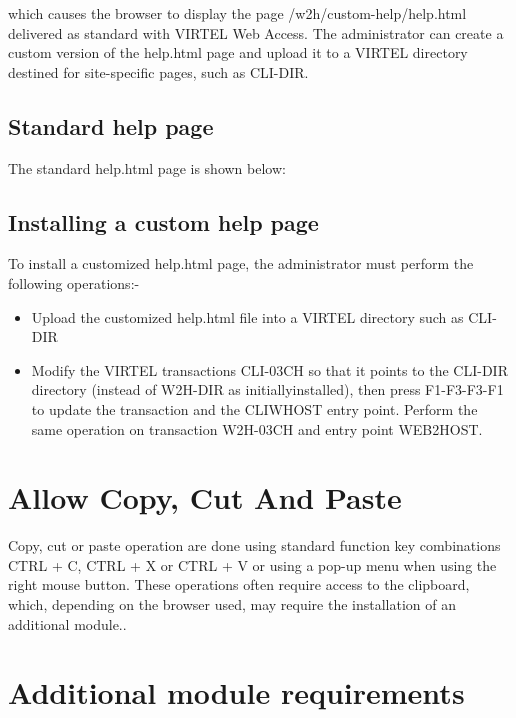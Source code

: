 \documentclass[letterpaper,10pt,english]{sphinxmanual}
\begin{document}

which causes the browser to display the page /w2h/custom-help/help.html delivered as standard with VIRTEL Web Access.
The administrator can create a custom version of the help.html page and upload it to a VIRTEL directory destined for
site-specific pages, such as CLI-DIR.


\subsection{Standard help page}
\label{\detokenize{User_Guide:standard-help-page}}
The standard help.html page is shown below:



\subsection{Installing a custom help page}
\label{\detokenize{User_Guide:installing-a-custom-help-page}}
To install a customized help.html page, the administrator must perform the following operations:-
\begin{itemize}
\item {} 
Upload the customized help.html file into a VIRTEL directory such as CLI-DIR

\item {} 
Modify the VIRTEL transactions CLI-03CH so that it points to the CLI-DIR directory (instead of W2H-DIR as initiallyinstalled), then press F1-F3-F3-F1 to update the transaction and the CLIWHOST entry point. Perform the same operation on transaction W2H-03CH and entry point WEB2HOST.

\end{itemize}


\section{Allow Copy, Cut And Paste}
\label{\detokenize{User_Guide:allow-copy-cut-and-paste}}
Copy, cut or paste operation are done using standard function key combinations CTRL + C, CTRL + X or CTRL + V or
using a pop-up menu when using the right mouse button. These operations often require access to the clipboard,
which, depending on the browser used, may require the installation of an additional module..


\section{Additional module requirements}
\label{\detokenize{User_Guide:additional-module-requirements}}
\end{document}
